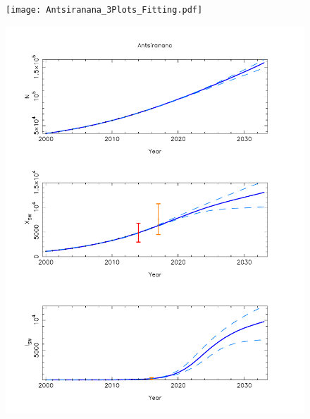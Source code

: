 \documentclass[preprint,12pt]{elsarticle}
\begin{document}
\begin{figure}[t]
	\centering
	\vspace{0.5cm}
	\begin{minipage}{0.47\textwidth}
		\centering
		\texttt{[image: Antsiranana\_3Plots\_Fitting.pdf]}
		\label{Neurona}	
	\end{minipage}%
	\hspace{0.01\textwidth}
	\begin{minipage}{0.47\textwidth}
		\centering
		\includegraphics[angle=0,width=1.0\textwidth]{Antsiranana_3Plots_Projected.pdf}
		\label{Volerrab}
	\end{minipage}
	

\end{figure}
\end{document}
